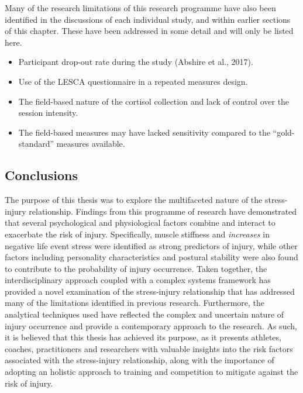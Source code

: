 \documentclass[man,floatsintext]{apa6}
\begin{document}
Many of the research limitations of this research programme have also been identified in the discussions of each individual study, and within earlier sections of this chapter.
These have been addressed in some detail and will only be listed here.

\begin{itemize}
\item
  Participant drop-out rate during the study (Abshire et al., 2017).
\item
  Use of the LESCA questionnaire in a repeated measures design.
\item
  The field-based nature of the cortisol collection and lack of control over the session intensity.
\item
  The field-based measures may have lacked sensitivity compared to the \enquote{gold-standard} measures available.
\end{itemize}

\hypertarget{conclusions}{%
\subsection{Conclusions}\label{conclusions}}

The purpose of this thesis was to explore the multifaceted nature of the stress-injury relationship.
Findings from this programme of research have demonstrated that several psychological and physiological factors combine and interact to exacerbate the risk of injury.
Specifically, muscle stiffness and \emph{increases} in negative life event stress were identified as strong predictors of injury, while other factors including personality characteristics and postural stability were also found to contribute to the probability of injury occurrence.
Taken together, the interdisciplinary approach coupled with a complex systems framework has provided a novel examination of the stress-injury relationship that has addressed many of the limitations identified in previous research.
Furthermore, the analytical techniques used have reflected the complex and uncertain nature of injury occurrence and provide a contemporary approach to the research.
As such, it is believed that this thesis has achieved its purpose, as it presents athletes, coaches, practitioners and researchers with valuable insights into the risk factors associated with the stress-injury relationship, along with the importance of adopting an holistic approach to training and competition to mitigate against the risk of injury.

\clearpage
\end{document}
